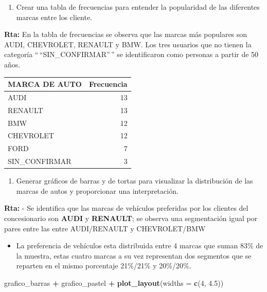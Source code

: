 \documentclass[
]{article}
\newenvironment{Shaded}{\begin{snugshade}}{\end{snugshade}}
\newcommand{\AttributeTok}[1]{\textcolor[rgb]{0.13,0.29,0.53}{#1}}
\newcommand{\DecValTok}[1]{\textcolor[rgb]{0.00,0.00,0.81}{#1}}
\newcommand{\FloatTok}[1]{\textcolor[rgb]{0.00,0.00,0.81}{#1}}
\newcommand{\FunctionTok}[1]{\textcolor[rgb]{0.13,0.29,0.53}{\textbf{#1}}}
\newcommand{\NormalTok}[1]{#1}
\newcommand{\SpecialCharTok}[1]{\textcolor[rgb]{0.81,0.36,0.00}{\textbf{#1}}}
\providecommand{\tightlist}{%
  \setlength{\itemsep}{0pt}\setlength{\parskip}{0pt}}
\begin{document}
\begin{enumerate}
\def\labelenumi{\alph{enumi}.}
\setcounter{enumi}{1}
\tightlist
\item
  Crear una tabla de frecuencias para entender la popularidad de las
  diferentes marcas entre los cliente.
\end{enumerate}

\textbf{Rta: }En la tabla de frecuencias se observa que las marcas más
populares son AUDI, CHEVROLET, RENAULT y BMW. Los tres usuarios que no
tienen la categoría ``\,``SIN\_CONFIRMAR''\,'' se identificaron como
personas a partir de 50 años.

\begin{tabular}{lr}
\toprule
MARCA DE AUTO & Frecuencia\\
\midrule
AUDI & 13\\
RENAULT & 13\\
BMW & 12\\
CHEVROLET & 12\\
FORD & 7\\
\addlinespace
SIN\_CONFIRMAR & 3\\
\bottomrule
\end{tabular}

\begin{enumerate}
\def\labelenumi{\alph{enumi}.}
\setcounter{enumi}{2}
\tightlist
\item
  Generar gráficos de barras y de tortas para visualizar la distribución
  de las marcas de autos y proporcionar una interpretación.
\end{enumerate}

\textbf{Rta: } - Se identifica que las marcas de vehículos preferidas
por los clientes del concesionario son \textbf{AUDI} y \textbf{RENAULT};
se observa una segmentación igual por pares entre las entre AUDI/RENAULT
y CHEVROLET/BMW

\begin{itemize}
\tightlist
\item
  La preferencia de vehículos esta distribuida entre 4 marcas que suman
  83\% de la muestra, estas cuatro marcas a su vez representan dos
  segmentos que se reparten en el mismo porcentaje 21\%/21\% y
  20\%/20\%.
\end{itemize}

\begin{Shaded}
\begin{Highlighting}[]
\NormalTok{ grafico\_barras }\SpecialCharTok{+}\NormalTok{ grafico\_pastel   }\SpecialCharTok{+} \FunctionTok{plot\_layout}\NormalTok{(}\AttributeTok{widths =} \FunctionTok{c}\NormalTok{(}\DecValTok{4}\NormalTok{, }\FloatTok{4.5}\NormalTok{))}
\end{Highlighting}
\end{Shaded}
\end{document}

